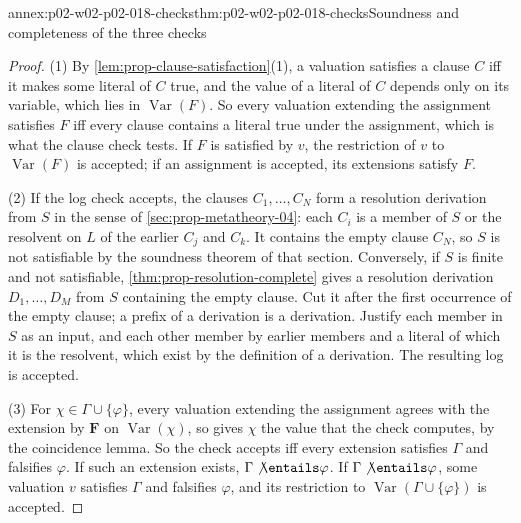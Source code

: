 \begin{annexitem}{annex:p02-w02-p02-018-checks}{thm:p02-w02-p02-018-checks}{Soundness and completeness of the three checks}
\begin{proof}
(1) By \cref{lem:prop-clause-satisfaction}(1), a valuation satisfies a clause
\(C\) iff it makes some literal of \(C\) true, and the value of a literal of
\(C\) depends only on its variable, which lies in \(\operatorname{Var}(F)\).
So every valuation extending the assignment satisfies \(F\) iff every clause
contains a literal true under the assignment, which is what the clause check
tests.  If \(F\) is satisfied by \(v\), the restriction of \(v\) to
\(\operatorname{Var}(F)\) is accepted; if an assignment is accepted, its
extensions satisfy \(F\).

(2) If the log check accepts, the clauses \(C_1,\ldots,C_N\) form a resolution
derivation from \(S\) in the sense of \cref{sec:prop-metatheory-04}: each
\(C_i\) is a member of \(S\) or the resolvent on \(L\) of the earlier
\(C_j\) and \(C_k\).  It contains the empty clause \(C_N\), so \(S\) is not
satisfiable by the soundness theorem of that section.  Conversely, if \(S\)
is finite and not satisfiable, \cref{thm:prop-resolution-complete} gives a
resolution derivation \(D_1,\ldots,D_M\) from \(S\) containing the empty
clause.  Cut it after the first occurrence of the empty clause; a prefix of a
derivation is a derivation.  Justify each member in \(S\) as an input, and
each other member by earlier members and a literal of which it is the
resolvent, which exist by the definition of a derivation.  The resulting log
is accepted.

(3) For \(\chi\in\Gamma\cup\{\varphi\}\), every valuation extending the
assignment agrees with the extension by \(\mathbf F\) on
\(\operatorname{Var}(\chi)\), so gives \(\chi\) the value that the check
computes, by the coincidence lemma.  So the check accepts iff every extension
satisfies \(\Gamma\) and falsifies \(\varphi\).  If such an extension exists,
\(\Gamma\not\entails\varphi\).  If \(\Gamma\not\entails\varphi\), some
valuation \(v\) satisfies \(\Gamma\) and falsifies \(\varphi\), and its
restriction to \(\operatorname{Var}(\Gamma\cup\{\varphi\})\) is accepted.
\end{proof}
\end{annexitem}

